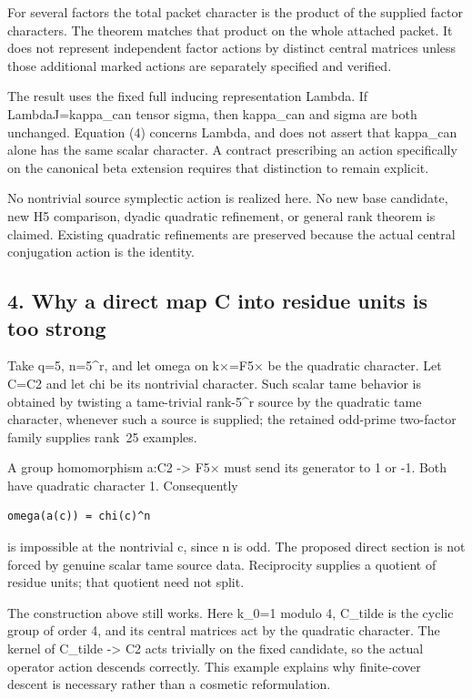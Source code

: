 For several factors the total packet character is the product of the
supplied factor characters. The theorem matches that product on the
whole attached packet. It does not represent independent factor actions
by distinct central matrices unless those additional marked actions are
separately specified and verified.

The result uses the fixed full inducing representation Lambda. If
Lambda\textbar J=kappa\_can tensor sigma, then kappa\_can and sigma are
both unchanged. Equation (4) concerns Lambda, and does not assert that
kappa\_can alone has the same scalar character. A contract prescribing
an action specifically on the canonical beta extension requires that
distinction to remain explicit.

No nontrivial source symplectic action is realized here. No new base
candidate, new H5 comparison, dyadic quadratic refinement, or general
rank theorem is claimed. Existing quadratic refinements are preserved
because the actual central conjugation action is the identity.

\hypertarget{odd_scalar-why-a-direct-map-c-into-residue-units-is-too-strong}{%
\subsection{4. Why a direct map C into residue units is too
strong}\label{odd_scalar-why-a-direct-map-c-into-residue-units-is-too-strong}}

Take q=5, n=5\^{}r, and let omega on k×=F5× be the quadratic character.
Let C=C2 and let chi be its nontrivial character. Such scalar tame
behavior is obtained by twisting a tame-trivial rank-5\^{}r source by
the quadratic tame character, whenever such a source is supplied; the
retained odd-prime two-factor family supplies rank~25 examples.

A group homomorphism a:C2 -\textgreater{} F5× must send its generator
to 1 or -1. Both have quadratic character 1. Consequently

\begin{Verbatim}[fontsize=\small,breaklines=true,breakanywhere=true]
omega(a(c)) = chi(c)^n
\end{Verbatim}

is impossible at the nontrivial c, since n is odd. The proposed direct
section is not forced by genuine scalar tame source data. Reciprocity
supplies a quotient of residue units; that quotient need not split.

The construction above still works. Here k\_0=1 modulo 4, C\_tilde is the
cyclic group of order 4, and its central matrices act by the quadratic
character. The kernel of C\_tilde -\textgreater{} C2 acts trivially on
the fixed candidate, so the actual operator action descends correctly.
This example explains why finite-cover descent is necessary rather than
a cosmetic reformulation.

